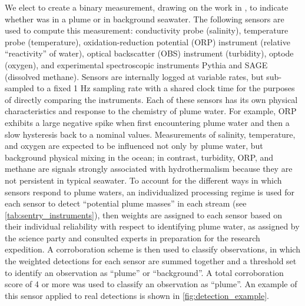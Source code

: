 We elect to create a binary measurement, drawing on the work in \cite{jakuba2007stochastic}, to indicate whether \Sentry was in a plume or in background seawater. The following sensors are used to compute this measurement: conductivity probe (salinity), temperature probe (temperature), oxidation-reduction potential (ORP) instrument (relative ``reactivity'' of water), optical backscatter (OBS) instrument (turbidity), optode (oxygen), and experimental spectroscopic instruments Pythia and SAGE (dissolved methane). Sensors are internally logged at variable rates, but sub-sampled to a fixed 1 Hz sampling rate with a shared clock time for the purposes of directly comparing the instruments. Each of these sensors has its own physical characteristics and response to the chemistry of plume water. For example, ORP exhibits a large negative spike when first encountering plume water and then a slow hysteresis back to a nominal values. Measurements of salinity, temperature, and oxygen are expected to be influenced not only by plume water, but background physical mixing in the ocean; in contrast, turbidity, ORP, and methane are signals strongly associated with hydrothermalism because they are not persistent in typical seawater. To account for the different ways in which sensors respond to plume waters, an individualized processing regime is used for each sensor to detect ``potential plume masses'' in each stream (see \cref{tab:sentry_instruments}), then weights are assigned to each sensor based on their individual reliability with respect to identifying plume water, as assigned by the science party and consulted experts in preparation for the research expedition. A corroboration scheme is then used to classify observations, in which the weighted detections for each sensor are summed together and a threshold set to identify an observation as ``plume'' or ``background''. A total corroboration score of 4 or more was used to classify an observation as ``plume''. An example of this sensor applied to real \Sentry detections is shown in \cref{fig:detection_example}.

